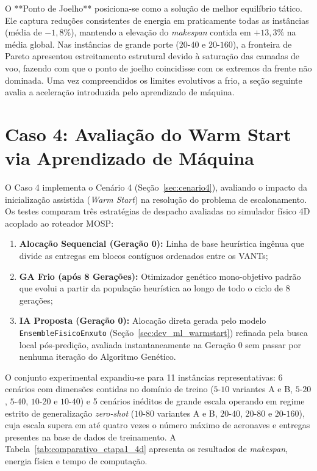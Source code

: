 O **Ponto de Joelho** posiciona-se como a solução de melhor equilíbrio tático. Ele captura reduções consistentes de energia em praticamente todas as instâncias (média de $-1{,}8\%$), mantendo a elevação do \textit{makespan} contida em $+13{,}3\%$ na média global. Nas instâncias de grande porte ($20\text{-}40$ e $20\text{-}160$), a fronteira de Pareto apresentou estreitamento estrutural devido à saturação das camadas de voo, fazendo com que o ponto de joelho coincidisse com os extremos da frente não dominada. Uma vez compreendidos os limites evolutivos a frio, a seção seguinte avalia a aceleração introduzida pelo aprendizado de máquina.

\section{Caso 4: Avaliação do Warm Start via Aprendizado de Máquina}\label{sec:caso4}

O Caso 4 implementa o Cenário 4 (Seção~\ref{sec:cenario4}), avaliando o impacto da inicialização assistida (\textit{Warm Start}) na resolução do problema de escalonamento. Os testes comparam três estratégias de despacho avaliadas no simulador físico 4D acoplado ao roteador MOSP:
\begin{enumerate}
    \item \textbf{Alocação Sequencial (Geração 0):} Linha de base heurística ingênua que divide as entregas em blocos contíguos ordenados entre os VANTs;
    \item \textbf{GA Frio (após 8 Gerações):} Otimizador genético mono-objetivo padrão que evolui a partir da população heurística ao longo de todo o ciclo de 8 gerações;
    \item \textbf{IA Proposta (Geração 0):} Alocação direta gerada pelo modelo \texttt{EnsembleFisicoEnxuto} (Seção~\ref{sec:dev_ml_warmstart}) refinada pela busca local pós-predição, avaliada instantaneamente na Geração 0 sem passar por nenhuma iteração do Algoritmo Genético.
\end{enumerate}

O conjunto experimental expandiu-se para 11 instâncias representativas: 6 cenários com dimensões contidas no domínio de treino ($5\text{-}10$ variantes A e B, $5\text{-}20$, $5\text{-}40$, $10\text{-}20$ e $10\text{-}40$) e 5 cenários inéditos de grande escala operando em regime estrito de generalização \textit{zero-shot} ($10\text{-}80$ variantes A e B, $20\text{-}40$, $20\text{-}80$ e $20\text{-}160$), cuja escala supera em até quatro vezes o número máximo de aeronaves e entregas presentes na base de dados de treinamento. A Tabela~\ref{tab:comparativo_etapa1_4d} apresenta os resultados de \textit{makespan}, energia física e tempo de computação.

